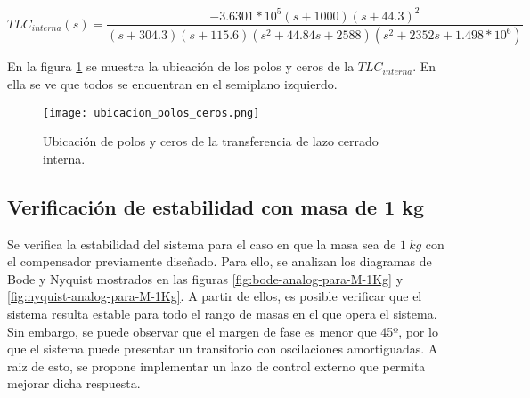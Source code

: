 \begin{equation*}
	TLC_{interna}(s)=\frac{-3.6301*10^5(s+1000)(s+44.3)^2}{(s+304.3) (s+115.6) (s^2 + 44.84s + 2588) (s^2 + 2352s + 1.498*10^6)}	
\end{equation*}

En la figura \ref{fig:ubicacion_polos_y_ceros} se muestra la ubicación de los polos y ceros de la $TLC_{interna}$. En ella se ve que todos se encuentran en el semiplano izquierdo. 

\begin{figure}[H]
	\centering
	\texttt{[image: ubicacion\_polos\_ceros.png]}
	\caption{Ubicación de polos y ceros de la transferencia de lazo cerrado interna.}
	\label{fig:ubicacion_polos_y_ceros}
\end{figure}
%
%

\subsection{Verificación de estabilidad con masa de 1 kg}


\noindent Se verifica la estabilidad del sistema  para el caso en que la masa sea de $1\:kg$ con el compensador previamente diseñado. Para ello, se analizan los diagramas de Bode y Nyquist mostrados en las figuras \ref{fig:bode-analog-para-M-1Kg} y \ref{fig:nyquist-analog-para-M-1Kg}. A partir de ellos, es posible verificar que el sistema resulta estable para todo el rango de masas en el que opera el sistema. Sin embargo, se puede observar que el margen de fase es menor que 45º, por lo que el sistema puede presentar un transitorio con oscilaciones amortiguadas. A raiz de esto, se propone implementar un lazo de control externo que permita mejorar dicha respuesta.

